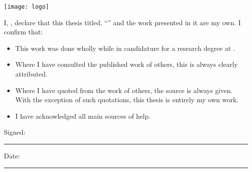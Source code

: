 \documentclass[
12pt, %
oneside, %
english, %
onehalfspacing, %
onehalfspacing, %
headsepline, %
]{MastersDoctoralThesis} %
\begin{document}
\begin{titlepage}
\begin{center}
\renewcommand\floatpagefraction{0.1}

\texttt{[image: logo]} %
 
\end{center}
\end{titlepage}


\begin{declaration}
\addchaptertocentry{\authorshipname} %
\noindent I, \authorname, declare that this thesis titled, \enquote{\ttitle} and the work presented in it are my own. I confirm that:

\begin{itemize} 
\item This work was done wholly while in candidature for a research degree at \univname.
\item Where I have consulted the published work of others, this is always clearly attributed.
\item Where I have quoted from the work of others, the source is always given. With the exception of such quotations, this thesis is entirely my own work.
\item I have acknowledged all main sources of help.
\end{itemize}
 
\noindent Signed:\\
\rule[0.5em]{25em}{0.5pt} %
 
\noindent Date:\\
\rule[0.5em]{25em}{0.5pt} %
\end{declaration}

\cleardoublepage
\end{document}
